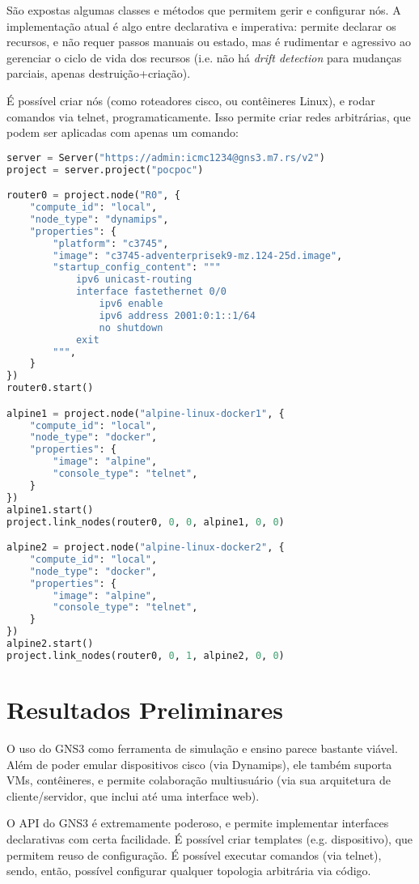 \documentclass[12pt]{article}
\begin{document}
São expostas algumas classes e métodos que permitem gerir e configurar nós. A
implementação atual é algo entre declarativa e imperativa: permite declarar os
recursos, e não requer passos manuais ou estado, mas é rudimentar e agressivo
ao gerenciar o ciclo de vida dos recursos (i.e. não há \textit{drift detection}
para mudanças parciais, apenas destruição+criação).

É possível criar nós (como roteadores cisco, ou contêineres Linux), e rodar
comandos via telnet, programaticamente. Isso permite criar redes arbitrárias,
que podem ser aplicadas com apenas um comando:

\begin{lstlisting}[language=Python]
server = Server("https://admin:icmc1234@gns3.m7.rs/v2")
project = server.project("pocpoc")

router0 = project.node("R0", {
    "compute_id": "local",
    "node_type": "dynamips",
    "properties": {
        "platform": "c3745",
        "image": "c3745-adventerprisek9-mz.124-25d.image",
        "startup_config_content": """
            ipv6 unicast-routing
            interface fastethernet 0/0
                ipv6 enable
                ipv6 address 2001:0:1::1/64
                no shutdown
            exit
        """,
    }
})
router0.start()

alpine1 = project.node("alpine-linux-docker1", {
    "compute_id": "local",
    "node_type": "docker",
    "properties": {
        "image": "alpine",
        "console_type": "telnet",
    }
})
alpine1.start()
project.link_nodes(router0, 0, 0, alpine1, 0, 0)

alpine2 = project.node("alpine-linux-docker2", {
    "compute_id": "local",
    "node_type": "docker",
    "properties": {
        "image": "alpine",
        "console_type": "telnet",
    }
})
alpine2.start()
project.link_nodes(router0, 0, 1, alpine2, 0, 0)
\end{lstlisting}

\section{Resultados Preliminares}

O uso do GNS3 como ferramenta de simulação e ensino parece bastante viável.
Além de poder emular dispositivos cisco (via Dynamips), ele também suporta VMs,
contêineres, e permite colaboração multiusuário (via sua arquitetura de
cliente/servidor, que inclui até uma interface web).

O API do GNS3 é extremamente poderoso, e permite implementar interfaces
declarativas com certa facilidade. É possível criar templates (e.g.
dispositivo), que permitem reuso de configuração. É possível executar comandos
(via telnet), sendo, então, possível configurar qualquer topologia arbitrária
via código.
\end{document}
